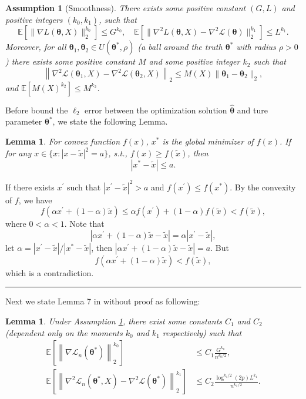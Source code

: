 \documentclass[12pt]{article}
\numberwithin{equation}{section}
\newtheorem{lemma}[theorem]{Lemma}
\newtheorem{assumption}[theorem]{Assumption}
\newenvironment{proof}{{\bf Proof:}}{\hfill\rule{2mm}{2mm}}
\begin{document}
\begin{assumption}[Smoothness]\label{assumption3.2}
	There exists some positive constant $(G,L)$ and positive integers $(k_0,k_1)$, such that
	\begin{equation}\label{3.4}
	\mathbb{E}\left[\|\nabla L(\boldsymbol{\theta},X)\|_2^{k_0}\right]\leq G^{k_0},\quad \mathbb{E}\left[\|\nabla^2L(\boldsymbol{\theta},X)-\nabla^2\mathcal{L}(\boldsymbol{\theta})\|_2^{k_1}\right]\leq L^{k_1}.
	\end{equation}
	Moreover, for all $\boldsymbol{\theta}_1,\boldsymbol{\theta}_2\in U(\boldsymbol{\theta}^{*},\rho)$ (a ball around the truth $\boldsymbol{\theta}^{*}$ with radius $\rho>0$) there exists some positive constant $M$ and some positive integer $k_2$ such that
	\begin{equation}
	\left\|\nabla^2\mathcal{L}(\boldsymbol{\theta}_1,X)-\nabla^2\mathcal{L}(\boldsymbol{\theta}_2,X)\right\|_2\leq M(X)\|\boldsymbol{\theta}_1-\boldsymbol{\theta}_2\|_2,
	\end{equation}
	and $\mathbb{E}[M(X)^{k_2}]\leq M^{k_2}$.
\end{assumption}
Before bound the $\ell_2$ error between the optimization solution $\widehat{\boldsymbol{\theta}}$ and ture parameter $\boldsymbol{\theta}^{*}$, we state the following Lemma.
\begin{lemma}\label{lemma 3.4}
	For convex function $f(x)$, $x^{*}$ is the global minimizer of $f(x)$. If for any $x \in \{x:|x-\tilde x|^2= a\}$, s.t., $f(x)\geq f(\tilde x)$, then
	$$
	|x^{*}-\tilde x|\leq a.
	$$
\end{lemma}
\begin{proof}
	If there exists $x^{'}$ such that $|x^{'}-\tilde x|^2>a$ and $f(x^{'})\leq f(x^{*})$. By the convexity of $f$, we have 
	$$
	f(\alpha x^{'}+(1-\alpha) \tilde x)\leq \alpha f(x^{'})+(1-\alpha)f(\tilde x)< f(\tilde x),
	$$
	where $0<\alpha<1$. Note that
	$$|\alpha x^{'}+(1-\alpha) \tilde x-\tilde x|=\alpha|x^{'}-\tilde x|,$$
	let $\alpha=|x^{'}-\tilde x|/|x^{*}-\tilde x|$, then $|\alpha x^{'}+(1-\alpha) \tilde x-\tilde x|=a$. But
	$$
	f(\alpha x^{'}+(1-\alpha) \tilde x)< f(\tilde x),
	$$
	which is a contradiction.
\end{proof}\newline
Next we state Lemma 7 in \citet{zhang2013communication} without proof as following:
\begin{lemma}\label{lemma3.5}
	Under Assumption \ref{assumption3.2}, there exist some constants $C_1$ and $C_2$ (dependent only on the moments $k_0$ and $k_1$ respectively) such that
	\begin{align}
	\mathbb{E}\left[\left\|\nabla \mathcal{L}_n\left(\boldsymbol{\theta}^{*}\right)\right\|_{2}^{k_{0}}\right] &\leq C_1 \frac{G^{k_{0}}}{n^{k_{0} / 2}},\label{3.6}\\
	\mathbb{E}\left[\left\|\nabla^{2} \mathcal{L}_n\left(\boldsymbol{\theta}^{*},X\right)-\nabla^{2} \mathcal{L}\left(\boldsymbol{\theta}^{*}\right)\right\|_{2}^{k_{1}}\right] &\leq C_2 \frac{\log ^{k_{1} / 2}(2 p) L^{k_{1}}}{n^{k_{1} / 2}}.\label{3.7}
	\end{align}
\end{lemma}
\end{document}
